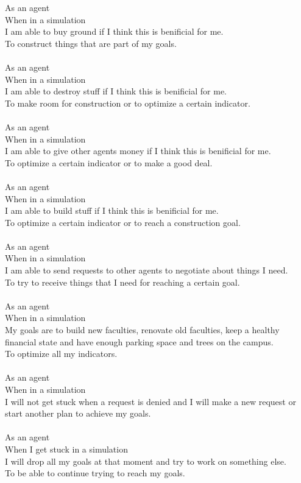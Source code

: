 As an agent\\
When in a simulation\\
I am able to buy ground if I think this is benificial for me.\\
To construct things that are part of my goals.\\
\\
As an agent\\
When in a simulation\\
I am able to destroy stuff if I think this is benificial for me.\\
To make room for construction or to optimize a certain indicator.\\
\\
As an agent\\
When in a simulation\\
I am able to give other agents money if I think this is benificial for me.\\
To optimize a certain indicator or to make a good deal.\\
\\
As an agent\\
When in a simulation\\
I am able to build stuff if I think this is benificial for me.\\
To optimize a certain indicator or to reach a construction goal.\\
\\
As an agent\\
When in a simulation\\
I am able to send requests to other agents to negotiate about things I need.\\
To try to receive things that I need for reaching a certain goal.\\
\\
As an agent\\
When in a simulation\\
My goals are to build new faculties, renovate old faculties, keep a healthy financial state and have enough parking space and trees on the campus.\\
To optimize all my indicators.\\
\\
As an agent\\
When in a simulation\\
I will not get stuck when a request is denied and I will make a new request or start another plan to achieve my goals.\\
\\
As an agent\\
When I get stuck in a simulation\\
I will drop all my goals at that moment and try to work on something else.\\
To be able to continue trying to reach my goals.

